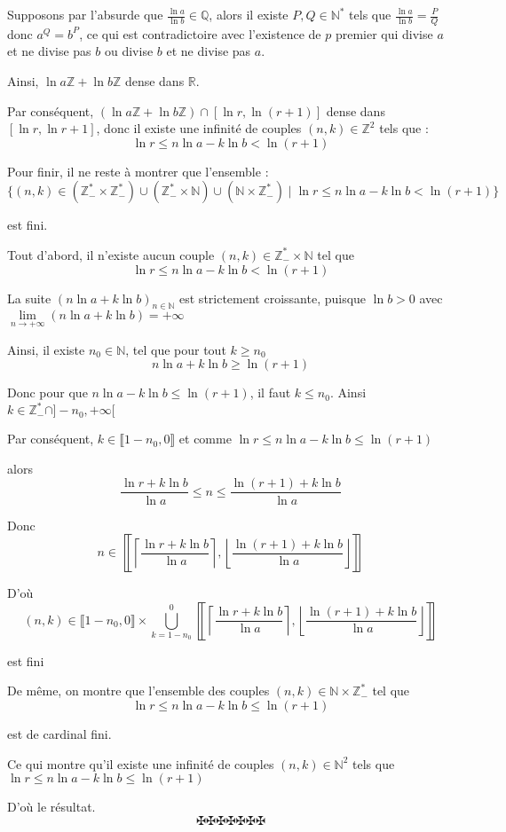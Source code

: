 Supposons par l'absurde que $\frac{\ln a}{\ln b} \in \mathbb{Q}$, alors il
existe $P, Q \in \mathbb{N}^{\ast}$ tels que $\frac{\ln a}{\ln b} =
\frac{P}{Q}$ donc $a^Q = b^P$, ce qui est contradictoire avec l'existence de
$p$ premier qui divise $a$ et ne divise pas $b$ ou divise $b$ et ne divise pas
$a$.

Ainsi, $\ln a\mathbb{Z}+ \ln b\mathbb{Z}$ dense dans $\mathbb{R}$.

Par cons{\'e}quent, $(\ln a\mathbb{Z}+ \ln b\mathbb{Z}) \cap [\ln r, \ln (r +
1)]$ dense dans $[\ln r, \ln r + 1]$, donc il existe une infinit{\'e} de
couples $(n, k) \in \mathbb{Z}^2$ tels que :
\[ \ln r \leq n \ln a - k \ln b < \ln (r + 1) \]


Pour finir, il ne reste {\`a} montrer que l'ensemble :
\[ \{(n, k) \in (\mathbb{Z}^{\ast}_- \times \mathbb{Z}^{\ast}_-) \cup
   (\mathbb{Z}^{\ast}_- \times \mathbb{N}) \cup (\mathbb{N} \times
   \mathbb{Z}^{\ast}_-) \mid \ln r \leq n \ln a - k \ln b < \ln (r + 1)\} \]


est fini.

Tout d'abord, il n'existe aucun couple $(n, k) \in \mathbb{Z}^{\ast}_- \times
\mathbb{N}$ tel que
\[ \ln r \leq n \ln a - k \ln b < \ln (r + 1) \]


La suite $(n \ln a + k \ln b)_{n \in \mathbb{N}}$ est strictement croissante,
puisque $\ln b > 0$ avec $\underset{n \rightarrow + \infty}{\lim} (n \ln a + k
\ln b) = + \infty$

Ainsi, il existe $n_0 \in \mathbb{N}$, tel que pour tout $k \geqslant n_0$
\[ n \ln a + k \ln b \geq \ln (r + 1) \]


Donc pour que $n \ln a - k \ln b \leq \ln (r + 1)$, il faut $k \leq n_0$.
Ainsi $k \in \mathbb{Z}_-^{\ast} \cap] - n_0, + \infty [$

Par cons{\'e}quent, $k \in \llbracket 1 - n_0, 0 \rrbracket$ et comme $\ln r
\leq n \ln a - k \ln b \leq \ln (r + 1)$

alors
\[ \frac{\ln r + k \ln b}{\ln a} \leq n \leq \frac{\ln (r + 1) + k \ln b}{\ln
   a} \]


Donc
\[ n \in \left\llbracket \left\lceil \frac{\ln r + k \ln b}{\ln a}
   \right\rceil, \left\lfloor \frac{\ln (r + 1) + k \ln b}{\ln a}
   \right\rfloor \right\rrbracket \]


D'o{\`u}
\[ (n, k) \in \llbracket 1 - n_0, 0 \rrbracket \times \bigcup_{k = 1 - n_0}^0
   \left\llbracket \left\lceil \frac{\ln r + k \ln b}{\ln a} \right\rceil,
   \left\lfloor \frac{\ln (r + 1) + k \ln b}{\ln a} \right\rfloor
   \right\rrbracket \]


est fini

De m{\^e}me, on montre que l'ensemble des couples $(n, k) \in \mathbb{N}
\times \mathbb{Z}_-^{\ast}$ tel que
\[ \ln r \leq n \ln a - k \ln b \leq \ln (r + 1) \]


est de cardinal fini.

Ce qui montre qu'il existe une infinit{\'e} de couples $(n, k) \in
\mathbb{N}^2$ tels que $\ln r \leq n \ln a - k \ln b \leq \ln (r + 1)$

D'o{\`u} le r{\'e}sultat.
\[ \maltese \maltese \maltese \maltese \maltese \maltese \maltese \]
